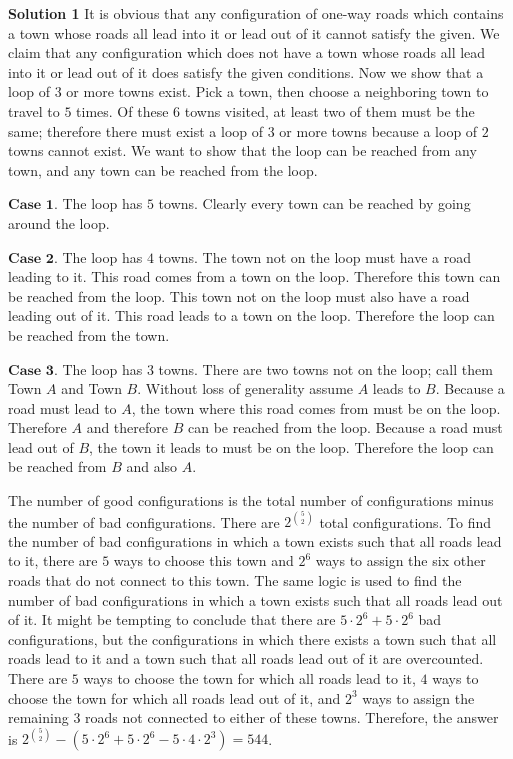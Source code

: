 \documentclass[a4paper,11pt]{article}
\begin{document}
\textbf{Solution 1}
It is obvious that any configuration of one-way roads which contains a town whose roads all lead into it or lead out of it cannot satisfy the given. We claim that any configuration which does not have a town whose roads all lead into it or lead out of it does satisfy the given conditions. Now we show that a loop of $3$ or more towns exist. Pick a town, then choose a neighboring town to travel to $5$ times. Of these $6$ towns visited, at least two of them must be the same; therefore there must exist a loop of $3$ or more towns because a loop of $2$ towns cannot exist. We want to show that the loop can be reached from any town, and any town can be reached from the loop.

$\textbf{Case 1}$. The loop has $5$ towns. Clearly every town can be reached by going around the loop.

$\textbf{Case 2}$. The loop has $4$ towns. The town not on the loop must have a road leading to it. This road comes from a town on the loop. Therefore this town can be reached from the loop. This town not on the loop must also have a road leading out of it. This road leads to a town on the loop. Therefore the loop can be reached from the town.

$\textbf{Case 3}$. The loop has $3$ towns. There are two towns not on the loop; call them Town $A$ and Town $B$. Without loss of generality assume $A$ leads to $B$. Because a road must lead to $A$, the town where this road comes from must be on the loop. Therefore $A$ and therefore $B$ can be reached from the loop. Because a road must lead out of $B$, the town it leads to must be on the loop. Therefore the loop can be reached from $B$ and also $A$.

The number of good configurations is the total number of configurations minus the number of bad configurations. There are $2^{{5\choose2}}$ total configurations. To find the number of bad configurations in which a town exists such that all roads lead to it, there are $5$ ways to choose this town and $2^6$ ways to assign the six other roads that do not connect to this town. The same logic is used to find the number of bad configurations in which a town exists such that all roads lead out of it. It might be tempting to conclude that there are $5 \cdot 2^6+5 \cdot 2^6$ bad configurations, but the configurations in which there exists a town such that all roads lead to it and a town such that all roads lead out of it are overcounted. There are $5$ ways to choose the town for which all roads lead to it, $4$ ways to choose the town for which all roads lead out of it, and $2^3$ ways to assign the remaining $3$ roads not connected to either of these towns. Therefore, the answer is $2^{{5\choose2}}-(5 \cdot 2^6+5 \cdot 2^6-5\cdot 4 \cdot 2^3)=\boxed{544}$.
\end{document}

